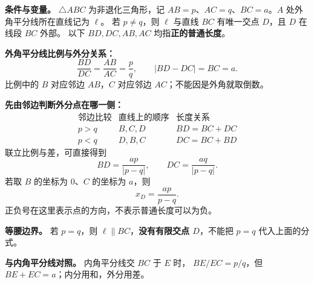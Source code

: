 \begin{statementbox}
\textbf{条件与变量。} $\triangle ABC$ 为非退化三角形，记
$AB=p$、$AC=q$、$BC=a$。$A$ 处外角平分线所在直线记为 $\ell$。
若 $p\ne q$，则 $\ell$ 与直线 $BC$ 有唯一交点 $D$，且 $D$ 在线段 $BC$ 外部。
以下 $BD,DC,AB,AC$ 均指\textbf{正的普通长度}。

\textbf{外角平分线比例与外分关系：}
\[
 \boxed{\frac{BD}{DC}=\frac{AB}{AC}=\frac pq},\qquad
 \boxed{|BD-DC|=BC=a}.
\]
比例中的 $B$ 对应邻边 $AB$，$C$ 对应邻边 $AC$；不能因是外角就取倒数。

\textbf{先由邻边判断外分点在哪一侧：}
\[
\begin{array}{c|c|c}
 \text{邻边比较}&\text{直线上的顺序}&\text{长度关系}\\ \hline
 p>q&B,C,D&BD=BC+DC\\
 p<q&D,B,C&DC=BC+BD
\end{array}
\]
联立比例与差，可直接得到
\[
 BD=\frac{ap}{|p-q|},\qquad DC=\frac{aq}{|p-q|}.
\]
若取 $B$ 的坐标为 $0$、$C$ 的坐标为 $a$，则
\[
 x_D=\frac{ap}{p-q}.
\]
正负号在这里表示点的方向，不表示普通长度可以为负。

\textbf{等腰边界。} 若 $p=q$，则 $\ell\parallel BC$，\textbf{没有有限交点 $D$}，不能把 $p=q$ 代入上面的分式。

\textbf{与内角平分线对照。} 内角平分线交 $BC$ 于 $E$ 时，
$BE/EC=p/q$，但 $BE+EC=a$；内分用和，外分用差。
\end{statementbox}
